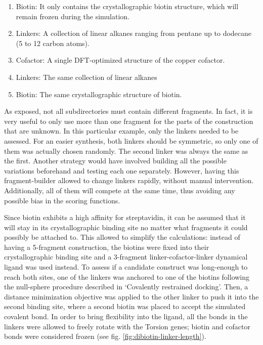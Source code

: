 \begin{enumerate}
	\item Biotin: It only contains the crystallographic biotin structure, which will remain frozen during the simulation.

	\item Linkers: A collection of linear alkanes ranging from pentane up to dodecane (5 to 12 carbon atoms).

	\item Cofactor: A single DFT-optimized structure of the copper cofactor.

	\item Linkers: The same collection of linear alkanes

	\item Biotin: The same crystallographic structure of biotin.
\end{enumerate}

As exposed, not all subdirectories must contain different fragments. In fact, it is very useful to only use more than one fragment for the parts of the construction that are unknown. In this particular example, only the linkers needed to be assessed. For an easier synthesis, both linkers should be symmetric, so only one of them was actually chosen randomly. The second linker was always the same as the first. Another strategy would have involved building all the possible variations beforehand and testing each one separately. However, having this fragment-builder allowed to change linkers rapidly, without manual intervention. Additionally, all of them will compete at the same time, thus avoiding any possible bias in the scoring functions.

Since biotin exhibits a high affinity for streptavidin, it can be assumed that it will stay in its crystallographic binding site no matter what fragments it could possibly be attached to. This allowed to simplify the calculations: instead of having a 5-fragment construction, the biotins were fixed into their crystallographic binding site and a 3-fragment linker-cofactor-linker dynamical ligand was used instead. To assess if a candidate construct was long-enough to reach both sites, one of the linkers was anchored to one of the biotins following the null-sphere procedure described in ‘Covalently restrained docking’. %
Then, a distance minimization objective was applied to the other linker to push it into the second binding site, where a second biotin was placed to accept the simulated covalent bond. In order to bring flexibility into the ligand, all the bonds in the linkers were allowed to freely rotate with the Torsion genes; biotin and cofactor bonds were considered frozen (see fig. \ref{fig:dibiotin-linker-length}).





